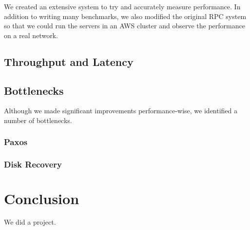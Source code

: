 \documentclass[letterpaper,10pt]{article}
\begin{document}
We created an extensive system to try and accurately measure performance. In addition to writing many benchmarks, we also modified the original RPC system so that we could run the servers in an AWS cluster and observe the performance on a real network. 

\subsection{Throughput and Latency}

\subsection{Bottlenecks}
Although we made significant improvements performance-wise, we identified a number of bottlenecks.

\subsubsection{Paxos}

\subsubsection{Disk Recovery}

\section{Conclusion}
We did a project.

\end{document}
